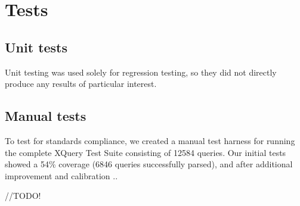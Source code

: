 \section{Tests}
\subsection{Unit tests}
Unit testing was used solely for regression testing, so they did not directly 
produce any results of particular interest.

\subsection{Manual tests}
To test for standards compliance, we created a manual test harness for running
the complete XQuery Test Suite\cite{w3c05} consisting of 12584 queries. Our
initial tests showed a 54\% coverage (6846 queries successfully parsed), and
after additional improvement and calibration ..

//TODO!


